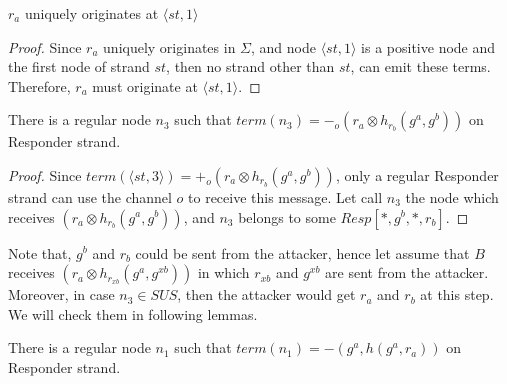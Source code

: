 \begin{Lemma}\label{lemme4.2}
$r_a$ uniquely originates at $\langle st,1 \rangle$ 
\end{Lemma}

\begin{proof}
Since $r_a$ uniquely originates in $\Sigma$, and node $\langle st,1 \rangle$ is a positive node and the first node of strand $st$, then no strand other than $st$, can emit these terms. Therefore, $r_a$ must originate at $\langle st,1 \rangle$.
\end{proof}

\begin{Lemma}\label{lemme4.3}
There is a regular node $n_3$ such that $term(n_3)= -_o(r_a \otimes h_{r_b}(g^a,g^b))$ on Responder strand. 
\end{Lemma}

\begin{proof}
Since $term(\langle st,3 \rangle) = +_o(r_a \otimes h_{r_b}(g^a,g^b))$, only a regular Responder strand can use the channel $o$ to receive this message. Let call $n_3$ the node which receives $(r_a \otimes h_{r_b}(g^a,g^b))$, and $n_3$ belongs to some $Resp[*,g^b,*,r_b]$.
\end{proof}

Note that, $g^b$ and $r_b$ could be sent from the attacker, hence let assume that $B$ receives $(r_a \otimes h_{r_{xb}}(g^a,g^{xb}))$ in which $r_{xb}$ and $g^{xb}$ are sent from the attacker. Moreover, in case $n_3 \in SUS$, then the attacker would get $r_a$ and $r_b$ at this step. We will check them in following lemmas. 

\begin{Lemma}\label{lemme4.4}
There is a regular node $n_1$ such that $term(n_1)= -(g^a,h(g^a,r_a))$ on Responder strand. 
\end{Lemma}

